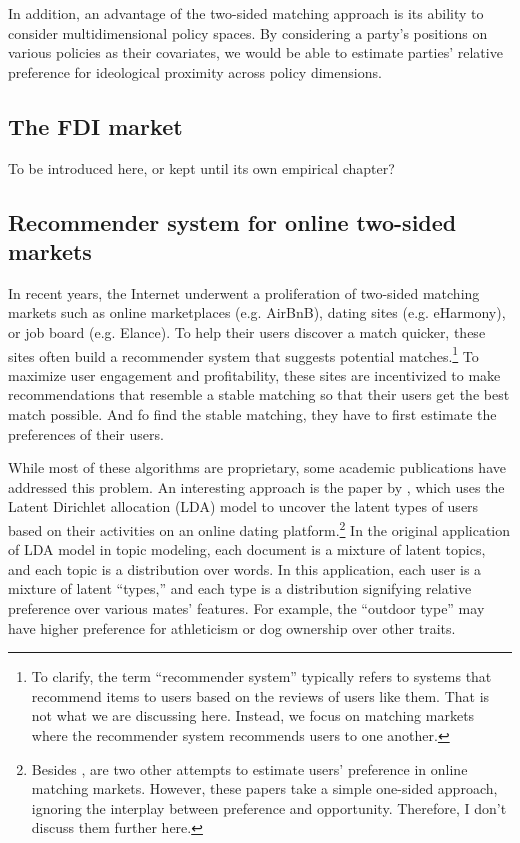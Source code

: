 In addition, an advantage of the two-sided matching approach is its ability to
consider multidimensional policy spaces. By considering a party's positions on
various policies as their covariates, we would be able to estimate parties'
relative preference for ideological proximity across policy dimensions.

\subsection{The FDI market}

To be introduced here, or kept until its own empirical chapter?

\subsection{Recommender system for online two-sided markets}

In recent years, the Internet underwent a proliferation of two-sided matching
markets such as online marketplaces (e.g. AirBnB), dating sites (e.g. eHarmony),
or job board (e.g. Elance). To help their users discover a match quicker, these
sites often build a recommender system that suggests potential
matches.\footnote{To clarify, the term ``recommender system'' typically refers
  to systems that recommend items to users based on the reviews of users like
  them. That is not what we are discussing here. Instead, we focus on matching
  markets where the recommender system recommends users to one another.} To
maximize user engagement and profitability, these sites are incentivized to make
recommendations that resemble a stable matching so that their users get the best
match possible. And fo find the stable matching, they have to first estimate the
preferences of their users.

While most of these algorithms are proprietary, some academic publications have
addressed this problem. An interesting approach is the paper by \citet{Tu2014},
which uses the Latent Dirichlet allocation (LDA) model to uncover the latent
types of users based on their activities on an online dating
platform.\footnote{Besides \citet{Tu2014}, \citet{Hitsch2010, Goswami2014} are
  two other attempts to estimate users' preference in online matching markets.
  However, these papers take a simple one-sided approach, ignoring the interplay
  between preference and opportunity. Therefore, I don't discuss them further
  here.} In the original application of LDA model in topic modeling, each
document is a mixture of latent topics, and each topic is a distribution over
words. In this application, each user is a mixture of latent ``types,'' and each
type is a distribution signifying relative preference over various mates'
features. For example, the ``outdoor type'' may have higher preference for
athleticism or dog ownership over other traits.

